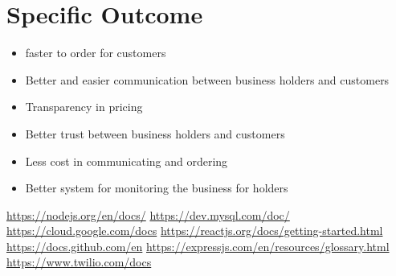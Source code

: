 \documentclass[13pt]{extarticle}
\begin{document}
\section{\textbf{Specific Outcome}}
\begin{itemize}
    \item faster to order for customers
    \item Better and easier communication between business holders and customers
    \item Transparency in pricing
    \item Better trust between business holders and customers
    \item Less cost in communicating and ordering
    \item Better system for monitoring the business for holders
\end{itemize}
\begin{thebibliography}{9}
\bibitem{}
 \href{https://nodejs.org/en/docs/}{https://nodejs.org/en/docs/}
\bibitem{}
\href{https://dev.mysql.com/doc/}{https://dev.mysql.com/doc/}
\bibitem{}
\href{https://cloud.google.com/docs}{https://cloud.google.com/docs}
\bibitem{}
\href{https://reactjs.org/docs/getting-started.html}{https://reactjs.org/docs/getting-started.html}
\bibitem{}
\href{https://docs.github.com/en}{https://docs.github.com/en}
\bibitem{}
\href{https://expressjs.com/en/resources/glossary.html}{https://expressjs.com/en/resources/glossary.html}
\bibitem{}
\href{https://www.twilio.com/docs}{https://www.twilio.com/docs}
\end{thebibliography}
\end{document}
